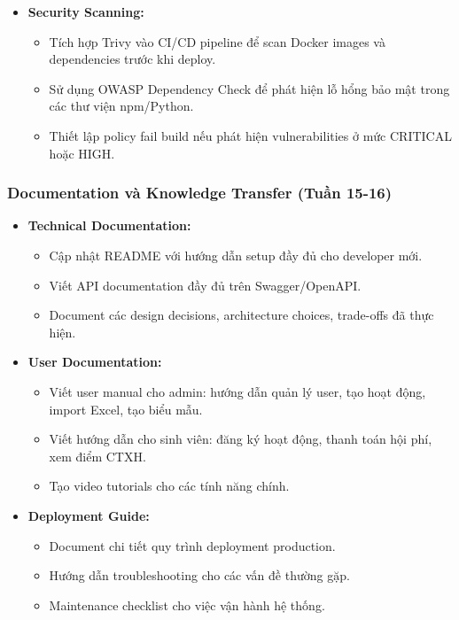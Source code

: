 \begin{itemize}
    \item \textbf{Security Scanning:}
    \begin{itemize}
        \item Tích hợp Trivy vào CI/CD pipeline để scan Docker images và dependencies trước khi deploy.
        \item Sử dụng OWASP Dependency Check để phát hiện lỗ hổng bảo mật trong các thư viện npm/Python.
        \item Thiết lập policy fail build nếu phát hiện vulnerabilities ở mức CRITICAL hoặc HIGH.
    \end{itemize}
\end{itemize}

\subsubsection{Documentation và Knowledge Transfer (Tuần 15-16)}

\begin{itemize}
    \item \textbf{Technical Documentation:}
    \begin{itemize}
        \item Cập nhật README với hướng dẫn setup đầy đủ cho developer mới.
        \item Viết API documentation đầy đủ trên Swagger/OpenAPI.
        \item Document các design decisions, architecture choices, trade-offs đã thực hiện.
    \end{itemize}
    
    \item \textbf{User Documentation:}
    \begin{itemize}
        \item Viết user manual cho admin: hướng dẫn quản lý user, tạo hoạt động, import Excel, tạo biểu mẫu.
        \item Viết hướng dẫn cho sinh viên: đăng ký hoạt động, thanh toán hội phí, xem điểm CTXH.
        \item Tạo video tutorials cho các tính năng chính.
    \end{itemize}
    
    \item \textbf{Deployment Guide:}
    \begin{itemize}
        \item Document chi tiết quy trình deployment production.
        \item Hướng dẫn troubleshooting cho các vấn đề thường gặp.
        \item Maintenance checklist cho việc vận hành hệ thống.
    \end{itemize}
\end{itemize}

